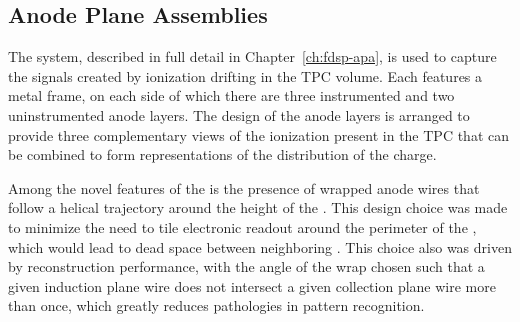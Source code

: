 

\subsection{Anode Plane Assemblies}
\label{sec:fdsp-ov-apa}

The  system, described in full detail in Chapter~\ref{ch:fdsp-apa}, is used to capture the signals created by ionization drifting in the TPC volume.  Each  features a metal frame, on each side of which there are three instrumented and two uninstrumented anode layers.  The design of the anode layers is arranged to provide three complementary views of the ionization present in the TPC that can be combined to form \threed representations of the distribution of the charge. %

Among the novel features of the \single \lartpc is the presence of wrapped anode wires that follow a helical trajectory around the height of the .  This design choice was made to minimize the need to tile electronic readout around the perimeter of the , which would lead to dead space between neighboring .  This choice also was driven by reconstruction performance, with the angle of the wrap chosen such that a given induction plane wire does not intersect a given collection plane wire more than once, which greatly reduces pathologies in pattern recognition. 


